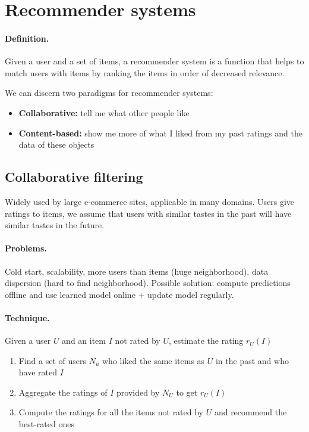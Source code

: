 
\section{Recommender systems}

\paragraph{Definition.} Given a user and a set of items, a recommender system is a function that helps to match users with items by ranking the items in order of decreased relevance.

We can discern two paradigms for recommender systems: 
\begin{itemize}
  \item \textbf{Collaborative:} tell me what other people like
  \item \textbf{Content-based:} show me more of what I liked from my past ratings and the data of these objects
\end{itemize}

\subsection{Collaborative filtering}

Widely used by large e-commerce sites, applicable in many domains. Users give ratings to items, we assume that users with similar tastes in the past will have similar tastes in the future.

\paragraph{Problems.} Cold start, scalability, more users than items (huge neighborhood), data dispersion (hard to find neighborhood). Possible solution: compute predictions offline and use learned model online + update model regularly.

\paragraph{Technique.} Given a user $U$ and an item $I$ not rated by $U$, estimate the rating $r_U(I)$

\begin{enumerate}
  \item Find a set of users $N_u$ who liked the same items as $U$ in the past and who have rated $I$
  \item Aggregate the ratings of $I$ provided by $N_U$ to get $r_U(I)$
  \item Compute the ratings for all the items not rated by $U$ and recommend the best-rated ones 
\end{enumerate}

